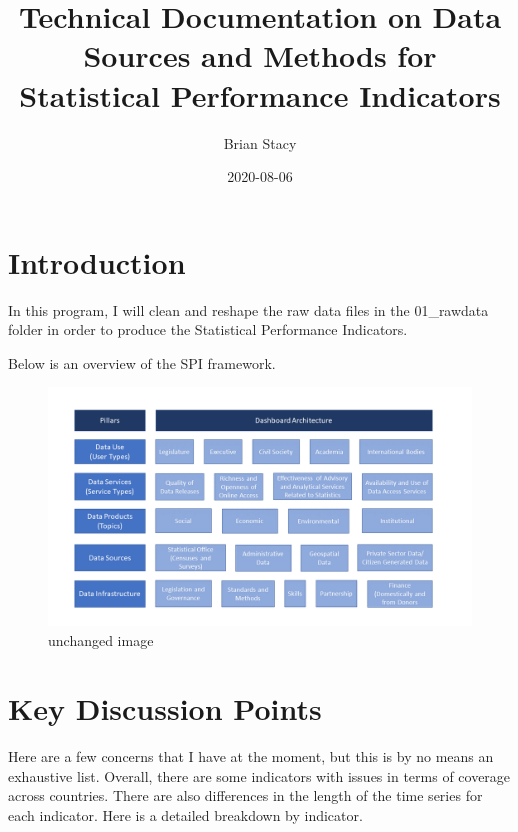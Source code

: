 \documentclass[]{article}
\title{Technical Documentation on Data Sources and Methods for Statistical
Performance Indicators}
\author{Brian Stacy}
\date{2020-08-06}
\begin{document}
\maketitle

{
\setcounter{tocdepth}{2}
\tableofcontents
}
\hypertarget{introduction}{%
\section{Introduction}\label{introduction}}

In this program, I will clean and reshape the raw data files in the
01\_rawdata folder in order to produce the Statistical Performance
Indicators.

Below is an overview of the SPI framework.

\begin{figure}
\centering
\includegraphics{SPI_dashboard.png}
\caption{unchanged image}
\end{figure}

\hypertarget{key-discussion-points}{%
\section{Key Discussion Points}\label{key-discussion-points}}

Here are a few concerns that I have at the moment, but this is by no
means an exhaustive list. Overall, there are some indicators with issues
in terms of coverage across countries. There are also differences in the
length of the time series for each indicator. Here is a detailed
breakdown by indicator.
\end{document}
